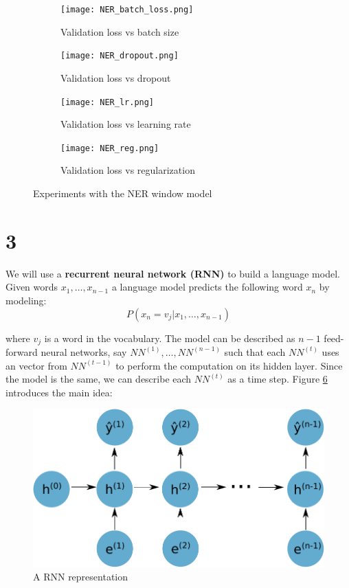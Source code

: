 \documentclass{article}
\begin{document}
\begin{figure}[H] 
  \begin{subfigure}[b]{0.5\linewidth}
    \centering
    \texttt{[image: NER\_batch\_loss.png]} 
    \caption{Validation loss vs batch size} 
    \label{ner_batch} 
    \vspace{4ex}
  \end{subfigure}%
  \begin{subfigure}[b]{0.5\linewidth}
    \centering
    \texttt{[image: NER\_dropout.png]} 
    \caption{Validation loss vs dropout} 
    \label{ner_dropout} 
    \vspace{4ex}
  \end{subfigure} 
  \begin{subfigure}[b]{0.5\linewidth}
    \centering
    \texttt{[image: NER\_lr.png]} 
    \caption{Validation loss vs learning rate} 
    \label{ner_lr} 
  \end{subfigure}%
  \begin{subfigure}[b]{0.5\linewidth}
    \centering
    \texttt{[image: NER\_reg.png]} 
    \caption{Validation loss vs regularization} 
    \label{ner_reg} 
  \end{subfigure} 
  \caption{Experiments with the NER window model}
  \label{NER_e} 
\end{figure}

\section{3} We will use a \textbf{recurrent neural network (RNN)} to build a language model. Given words $x_{1}, \dots ,x_{n-1}$ a language model predicts the following word $x_{n}$ by modeling:
\[
P(x_{n} = v_{j} | x_{1}, \dots ,x_{n-1})
\]

where $v_{j}$ is a word in the vocabulary. The model can be described as $n-1$ feed-forward neural networks, say $NN^{(1)}, \dots,NN^{(n-1)} $ such that each $NN^{(t)}$ uses an vector from $NN^{(t-1)}$ to perform the computation on its hidden layer. Since the model is the same, we can describe each $NN^{(t)}$ as a time step. Figure \ref{RNN_re} introduces the main idea:     

\begin{figure}[H] 
\begin{center}
\includegraphics[scale=0.85]{RNN_ball.pdf}
\end{center}
\caption{A RNN representation}
\label{RNN_re}
\end{figure}
\end{document}
